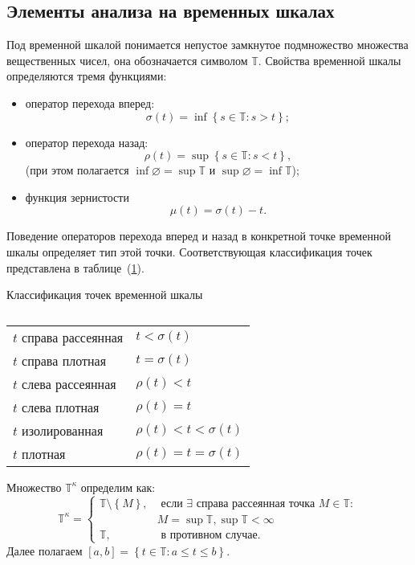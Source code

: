 \subsection{Элементы анализа на временных шкалах}
\begin{definition}
	Под временной шкалой понимается непустое замкнутое подмножество множества
	вещественных чисел, она обозначается символом $\mathbb{T}$.
	Свойства временной шкалы определяются тремя функциями:
	\begin{itemize}
		\item[1)] оператор перехода вперед:
		\[
		\sigma(t) = \inf\left\{s \in \mathbb{T}: s > t\right\};
		\]
		\item[2)] оператор перехода назад:
		\[
		\rho(t) = \sup\left\{s \in \mathbb{T}: s < t\right\},
		\]
		(при этом полагается $\inf\varnothing = \sup{\mathbb{T}}$ и $\sup\varnothing = \inf{\mathbb{T}}$);
		\item[3)] функция зернистости
		$$\mu(t) = \sigma(t) - t.$$
	\end{itemize}
\end{definition}
Поведение операторов перехода вперед и назад в конкретной точке временной шкалы
определяет тип этой точки. Соответствующая классификация точек представлена в
таблице~(\ref{tab:pointclass}).
\begin{table}[h]

	\centering		
		\caption{}	
		\footnotesize Классификация точек временной шкалы\\
		\normalsize
		\begin{tabular}{|l|l|}
			\hline
			$t$ справа рассеянная & $t < \sigma(t)$ \\
			$t$ справа плотная    & $t = \sigma(t)$ \\
			$t$ слева рассеянная  & $ \rho(t) < t $ \\
			$t$ слева плотная     & $ \rho(t) = t $ \\
			$t$ изолированная      & $\rho(t) < t < \sigma(t)$ \\
			$t$ плотная           & $\rho(t) = t = \sigma(t)$ \\
			\hline
		\end{tabular}
	
	\label{tab:pointclass}
\end{table}

\begin{definition}
	 Множество $\mathbb{T}^\kappa$ определим как:
	 \[
	 \mathbb{T}^\kappa =
	 \begin{cases}
	 \mathbb{T}\setminus \left\{M\right\}, & \text{ если }
	 \exists \text{ справа рассеянная точка } M \in \mathbb{T}:\\
	 & M = \sup\mathbb{T}, \sup\mathbb{T}<\infty  \\
	 \mathbb{T} , & \text{ в противном случае}.
	 \end{cases}
	 \]
	 Далее полагаем $\left[a, b\right] =
	 \left\{t \in \mathbb{T} : a \leqslant t \leqslant b\right\}$.
\end{definition}

